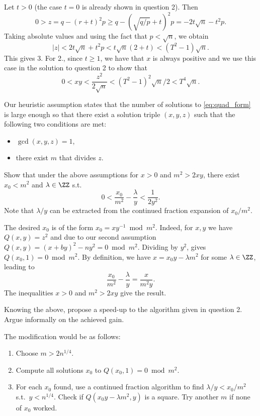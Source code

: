 \documentclass[11pt]{exam}
\theoremstyle{definition}
\begin{document}
{\begin{questions}
\begin{solution}
		Let $t>0$ (the case $t=0$ is already shown in question 2). Then
		\[
			0 > z = q-(r+t)^2 p \geq q - (\sqrt{q/p}+t)^2 p = -2t \sqrt{n} - t^2p.
		\]
		Taking absolute values and using the fact that $p<\sqrt{n}$, we obtain
		\[
			|z| < 2t \sqrt{n}+t^2p < t\sqrt{n}(2+t) < (T^2-1) \sqrt{n}.
		\]
		This gives 3. For 2., since $t \geq 1$, we have that $x$ is always positive and we use this case in the solution to question 2 to show that
		\[
		0<xy < \frac{z^2}{2 \sqrt{n}} < (T^2-1)^2 \sqrt{n}/2 < T^4 \sqrt{n}.
		\]
	\end{solution}
	Our heuristic assumption states that  the number of solutions to \eqref{eq:quad_form} is large enough so that there exist a solution triple $(x, y,z)$ such that the following two conditions are met: 
	\begin{itemize}
		\item $\gcd(x,y,z)=1$,
		\item  there exist $m$ that divides $z$.  
	\end{itemize}
	\question  Show that under the above assumptions for $x>0$ and $m^2 > 2xy$, there exist $x_0 < m^2$ and $\lambda \in \ZZ$ s.t.
	\[
		0 < \frac{x_0}{m^2} - \frac{\lambda}{y} < \frac{1}{2 y^2}.
	\]
	Note that $\lambda / y$ can be extracted from the continued fraction expansion of $x_0/m^2$.
	\begin{solution}
		The desired $x_0$ is of the form $x_0 = xy^{-1}\bmod m^2$. Indeed, for $x, y$ we have $Q(x,y) = z^2$ and due to our second assumption $Q(x,y) = (x+by)^2 - ny^2 =0 \bmod m^2$. Dividing by $y^2$, gives $Q(x_0, 1) = 0 \bmod m^2$. By definition, we have $x = x_0y - \lambda m^2$ for some $\lambda \in \ZZ$, leading to 
		\[
			\frac{x_0}{m^2} - \frac{\lambda}{y} = \frac{x}{m^2 y}.
		\]
		The inequalities  $x>0$ and $m^2>2xy$ give the result.
	\end{solution}

	\question Knowing the above, propose a speed-up to the algorithm given in question 2. Argue informally on the achieved gain.
	\begin{solution}
		The modification would be as follows: 
		\begin{enumerate}
			\item Choose $m > 2n^{1/4}$.
			\item Compute all solutions $x_0$ to $Q(x_0, 1) = 0 \bmod m^2$.
			\item For each $x_0$ found, use a continued fraction algorithm to find $\lambda/y < x_0/m^2$ s.t.\ $y < n^{1/4}$. Check if $Q(x_0y - \lambda m^2, y)$ is a square. Try another $m$ if none of $x_0$ worked. 
		\end{enumerate}
	

\end{solution}
\end{questions}}
\end{document}
